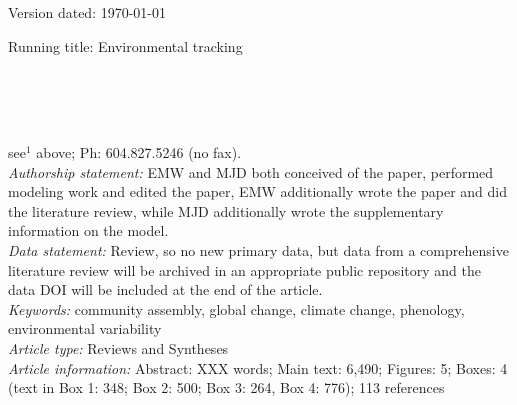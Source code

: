 \documentclass[11pt,letterpaper]{article}
\begin{document}
\begin{flushright}
Version dated: \today
\end{flushright}
\bigskip
\noindent Running title: Environmental tracking 
\bigskip
\medskip
\begin{center}
\\
\bigskip
{}\\
\\
\medskip
\end{center}
 see$^{1}$ above; Ph: 604.827.5246 (no fax).\\

\noindent \emph{Authorship statement:} EMW and MJD both conceived of the paper, performed modeling work and edited the paper, EMW additionally wrote the paper and did the literature review, while MJD additionally wrote the supplementary information on the model.  \\
\noindent \emph{Data statement:} Review, so no new primary data, but data from a comprehensive literature review will be archived in an appropriate public repository and the data DOI will be included at the end of the article. \\
\noindent \emph{Keywords:} community assembly, global change, climate change, phenology, environmental variability\\
\noindent \emph{Article type:} Reviews and Syntheses\\
\noindent \emph{Article information:} Abstract: XXX words; Main text: 6,490; Figures: 5; Boxes: 4 (text in Box 1: 348; Box 2: 500; Box 3: 264, Box 4: 776); 113 references
\newpage
\end{document}
